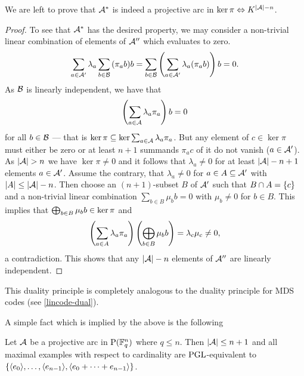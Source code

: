 We are left to prove that ${\mathcal{A}}^{\ast}$ is indeed a projective arc in $\ker\pi\iso K^{\card\cA-n}$.

\begin{proof}    
To see that ${\mathcal{A}}^{\ast}$ has the desired property, we may consider a non-trivial linear combination of elements of $\mathcal{A}''$ which evaluates to zero.
$$
\sum_{a\in\mathcal{A}'}{\lambda_a\sum_{b\in\mathcal{B}}{(\pi_a b)b}}=\sum_{b\in\mathcal{B}}{\left(\sum_{a\in\mathcal{A}'}{\lambda_a(\pi_a b)}\right)b}=0.
$$
As $\mathcal{B}$ is linearly independent, we have that
$$
\left(\sum_{a\in\mathcal{A}}{\lambda_a\pi_a}\right)b=0
$$
for all $b\in\mathcal{B}$ --- that is $\ker\pi\subseteq \ker{\sum_{a\in\mathcal{A}}{\lambda_a\pi_a}}$. But any element of $c\in\ker \pi$ must either be zero or at least $n+1$ summands $\pi_a c$ of it do not vanish ($a\in \mathcal{A}'$). As $\card\cA>n$ we have $\ker\pi\neq 0$ and it follows that $\lambda_a\neq 0$ for at least $\left|\mathcal{A}\right|-n+1$ elements $a\in\mathcal{A}'$. Assume the contrary, that $\lambda_a\neq 0$ for $a\in A\subseteq \mathcal{A}'$ with $\left|A\right|\leq \left|\mathcal{A}\right|-n$. Then choose an $(n+1)$-subset $B$ of $\mathcal{A}'$ such that $B\setmeet A=\set{c}$ and a non-trivial linear combination $\sum_{b\in B}{\mu_b b}=0$ with $\mu_b\neq 0$ for $b\in B$.
This implies that $\bigoplus_{b\in B}{\mu_b b}\in\ker \pi$ and
$$
\left(\sum_{a\in A}{\lambda_a\pi_a}\right)\left(\bigoplus_{b\in B}{\mu_b b}\right)=\lambda_c\mu_c\neq 0, 
$$
a contradiction. This shows that any $\left|\mathcal{A}\right|-n$ elements of $\mathcal{A}''$ are linearly independent.
\end{proof}

This duality principle is completely analogous to the duality principle for MDS codes (see \autoref{lincode-dual}).

A simple fact which is implied by the above is the following
%
\begin{corollary}\label{mds-ngeqq}
    Let $\mathcal{A}$ be a projective arc in $\P(\field{q}^n)$ where $q\leq n$. Then $\left|\mathcal{A}\right|\leq n+1$ and all maximal examples with respect to cardinality are $\mathrm{PGL}$-equivalent to $\set{\gen{e_0},\ldots,\gen{e_{n-1}},\gen{e_0+\cdots+e_{n-1}}}$.
\end{corollary}

